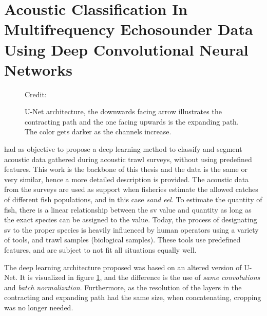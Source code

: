 \clearpage
\section{Acoustic Classification In Multifrequency Echosounder Data Using Deep Convolutional Neural Networks} \label{unet_paper_acoustic}
    
        \begin{figure}[H]
        \centering
        
        \caption[U-Net architecture]{U-Net architecture, the downwards facing arrow illustrates the contracting path and the one facing upwards is the expanding path. The color gets darker as the channels increase.}
      	\medskip 
        \label{unet__brautset_fig}
        \hspace*{15pt}\hbox{\scriptsize Credit: \citeauthor{brautaset2020acoustic}\cite{brautaset2020acoustic}}
    \end{figure}
    
    
    \citeauthor{brautaset2020acoustic}\cite{brautaset2020acoustic} had as objective to propose a deep learning method to classify and segment acoustic data gathered during acoustic trawl surveys, without using predefined features. This work is the backbone of this thesis and the data is the same or very similar, hence a more detailed description is provided. The acoustic data from the surveys are used as support when fisheries estimate the allowed catches of different fish populations, and in this case \textit{sand eel}. To estimate the quantity of fish, there is a linear relationship between the \gls{sv} value and quantity as long as the exact species can be assigned to the value. Today, the process of designating \gls{sv} to the proper species is heavily influenced by human operators using a variety of tools, and trawl samples (biological samples). These tools use predefined features, and are subject to not fit all situations equally well. 
    
    The deep learning architecture proposed was based on an altered version of \citeauthor{unet_ronneberger2015}\cite{unet_ronneberger2015} U-Net\cite{brautaset2020acoustic}. It is visualized in figure \ref{unet__brautset_fig}, and the difference is the use of \textit{same convolutions} and \textit{batch normalization}. Furthermore, as the resolution of the layers in the contracting and expanding path had the same size, when concatenating, cropping was no longer needed. 
    
